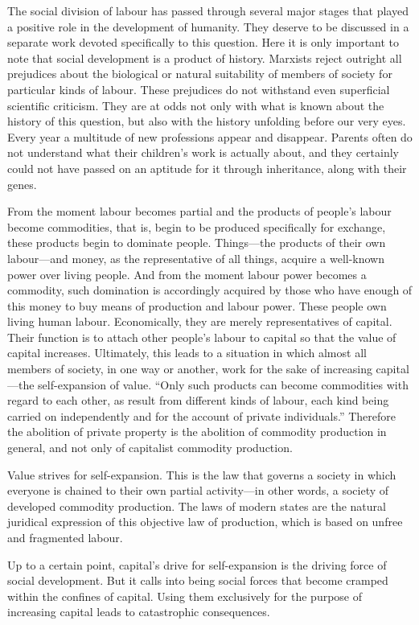 \documentclass[../main]{subfiles}
\begin{document}
The social division of labour has passed through several major stages that played a positive role in the development of humanity. They deserve to be discussed in a separate work devoted specifically to this question. Here it is only important to note that social development is a product of history. Marxists reject outright all prejudices about the biological or natural suitability of members of society for particular kinds of labour. These prejudices do not withstand even superficial scientific criticism. They are at odds not only with what is known about the history of this question, but also with the history unfolding before our very eyes. Every year a multitude of new professions appear and disappear. Parents often do not understand what their children’s work is actually about, and they certainly could not have passed on an aptitude for it through inheritance, along with their genes.

From the moment labour becomes partial and the products of people’s labour become commodities, that is, begin to be produced specifically for exchange, these products begin to dominate people. Things—the products of their own labour—and money, as the representative of all things, acquire a well-known power over living people. And from the moment labour power becomes a commodity, such domination is accordingly acquired by those who have enough of this money to buy means of production and labour power. These people own living human labour. Economically, they are merely representatives of capital. Their function is to attach other people’s labour to capital so that the value of capital increases. Ultimately, this leads to a situation in which almost all members of society, in one way or another, work for the sake of increasing capital—the self-expansion of value. “Only such products can become commodities with regard to each other, as result from different kinds of labour, each kind being carried on independently and for the account of private individuals.” Therefore the abolition of private property is the abolition of commodity production in general, and not only of capitalist commodity production.

Value strives for self-expansion. This is the law that governs a society in which everyone is chained to their own partial activity—in other words, a society of developed commodity production. The laws of modern states are the natural juridical expression of this objective law of production, which is based on unfree and fragmented labour.

Up to a certain point, capital's drive for self-expansion is the driving force of social development. But it calls into being social forces that become cramped within the confines of capital. Using them exclusively for the purpose of increasing capital leads to catastrophic consequences.
\end{document}
